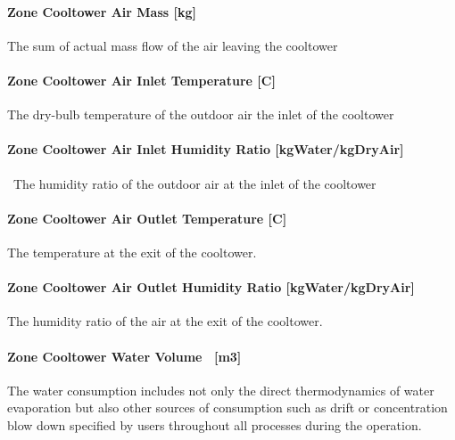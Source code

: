 \paragraph{Zone Cooltower Air Mass {[}kg{]}}\label{zone-cooltower-air-mass-kg}

The sum of actual mass flow of the air leaving the cooltower

\paragraph{Zone Cooltower Air Inlet Temperature {[}C{]}}\label{zone-cooltower-air-inlet-temperature-c}

The dry-bulb temperature of the outdoor air the inlet of the cooltower

\paragraph{Zone Cooltower Air Inlet Humidity Ratio {[}kgWater/kgDryAir{]}}\label{zone-cooltower-air-inlet-humidity-ratio-kgwaterkgdryair}

~The humidity ratio of the outdoor air at the inlet of the cooltower

\paragraph{Zone Cooltower Air Outlet Temperature {[}C{]}}\label{zone-cooltower-air-outlet-temperature-c}

The temperature at the exit of the cooltower.

\paragraph{Zone Cooltower Air Outlet Humidity Ratio {[}kgWater/kgDryAir{]}}\label{zone-cooltower-air-outlet-humidity-ratio-kgwaterkgdryair}

The humidity ratio of the air at the exit of the cooltower.

\paragraph{Zone Cooltower Water Volume ~{[}m3{]}}\label{zone-cooltower-water-volume-m3}

The water consumption includes not only the direct thermodynamics of water evaporation but also other sources of consumption such as drift or concentration blow down specified by users throughout all processes during the operation.

